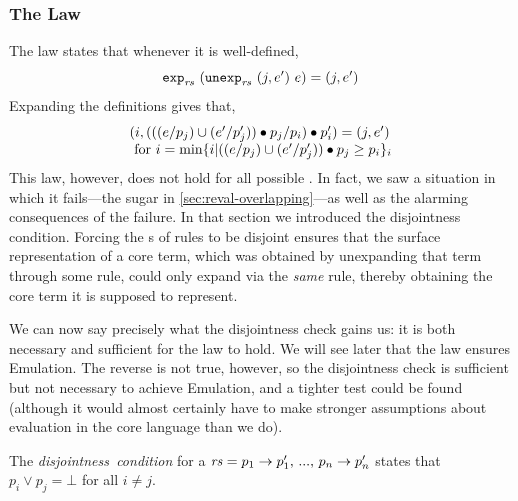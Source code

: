 \subsubsection{The {\Putget} Law}
\label{sec:reval-putget}
\label{sec:reval-disjoint}
The {\Putget} law states that whenever it is well-defined,
\[ \texttt{exp}_{\mathit{rs}}\ {(\texttt{unexp}_{\mathit{rs}}\ {(j, e')}\ {e})} = (j, e') \]
Expanding the definitions gives that,
\[\begin{array}{lcll}
(i, (((e / p_j) \cup (e' / p_j')) \bullet p_j / p_i) \bullet p_i')
  = (j, e') \\
   \text{ for $i = \text{min} \{i |
               ((e / p_j) \cup (e' / p_j')) \bullet p_j \geq p_i\}_i$}
\end{array}\]
This law, however, does not hold for all possible {}. In fact,
we saw a situation in which it fails---the  sugar in
\cref{sec:reval-overlapping}---as well as the alarming consequences of the
failure. In that section we introduced the disjointness condition.
Forcing the s of rules to be disjoint ensures that the surface
representation of a core term, which was obtained by unexpanding that term
through some rule, could only expand via the \emph{same} rule, thereby
obtaining the core term it is supposed to represent.

We can now say precisely what the disjointness check gains us: it is both
necessary and sufficient for the {\Putget} law to hold.  We will see later
that the {\Putget} law ensures Emulation. The reverse is not true, however,
so the disjointness check is sufficient but not necessary to achieve
Emulation, and a tighter test could be found (although it would almost
certainly have to make stronger assumptions about evaluation in the core
language than we do).

\begin{definition}
The \emph{disjointness~condition} for a {} $\mathit{rs} = p_1 \to
p_1',\,...,\,p_n \to p_n'$ states that $p_i \!\vee\! p_j = \bot$ for all
$i \neq j$.
\end{definition}

